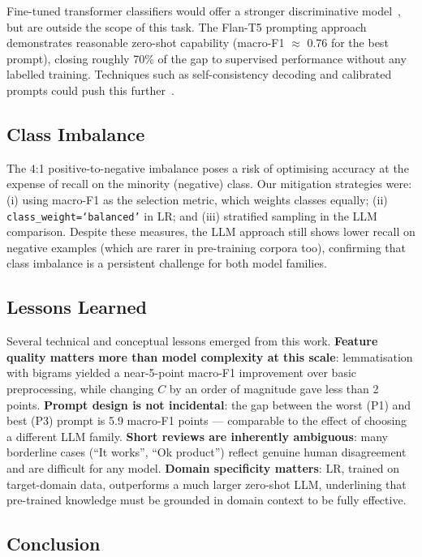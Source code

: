 \documentclass[10pt,twocolumn]{article}
\begin{document}
Fine-tuned transformer classifiers would offer a stronger discriminative
model~\citep{devlin2019bert}, but are outside the scope of this task.
The Flan-T5 prompting approach demonstrates reasonable zero-shot capability
(macro-F1 $\approx$ 0.76 for the best prompt), closing roughly 70\% of the
gap to supervised performance without any labelled training.
Techniques such as self-consistency decoding and calibrated prompts
could push this further~\citep{zhao2021calibrate}.

\subsection{Class Imbalance}

The 4:1 positive-to-negative imbalance poses a risk of optimising accuracy
at the expense of recall on the minority (negative) class.
Our mitigation strategies were: (i) using macro-F1 as the selection metric,
which weights classes equally; (ii) \texttt{class\_weight=`balanced'} in
LR; and (iii) stratified sampling in the LLM comparison.
Despite these measures, the LLM approach still shows lower recall on
negative examples (which are rarer in pre-training corpora too), confirming
that class imbalance is a persistent challenge for both model families.

\subsection{Lessons Learned}

Several technical and conceptual lessons emerged from this work.
\textbf{Feature quality matters more than model complexity at this scale}:
lemmatisation with bigrams yielded a near-5-point macro-F1 improvement
over basic preprocessing, while changing $C$ by an order of magnitude
gave less than 2 points.
\textbf{Prompt design is not incidental}: the gap between the worst (P1)
and best (P3) prompt is 5.9 macro-F1 points --- comparable to the effect of
choosing a different LLM family.
\textbf{Short reviews are inherently ambiguous}: many borderline cases
(``It works'', ``Ok product'') reflect genuine human disagreement and are
difficult for any model.
\textbf{Domain specificity matters}: LR, trained on target-domain data,
outperforms a much larger zero-shot LLM, underlining that pre-trained knowledge
must be grounded in domain context to be fully effective.

\subsection{Conclusion}
\end{document}
